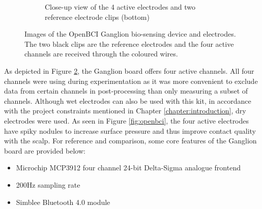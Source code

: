\begin{figure}
\begin{subfigure}[c]{0.45\textwidth}
         \caption{Close-up view of the 4 active electrodes and two reference electrode clips (bottom)}
         \label{fig:openbci-electrodes}
     \end{subfigure}
        \caption[Images of the OpenBCI Ganglion bio-sensing device and electrodes]{Images of the OpenBCI Ganglion bio-sensing device and electrodes. The two black clips are the reference electrodes and the four active channels are received through the coloured wires.}
        \label{fig:openbci-subfigs}
\end{figure}
As depicted in Figure \ref{fig:openbci-subfigs}, the Ganglion board offers four active channels. All four channels were using during experimentation as it was more convenient to exclude data from certain channels in post-processing than only measuring a subset of channels. Although wet electrodes can also be used with this kit, in accordance with the project constraints mentioned in Chapter \ref{chapter:introduction}, dry electrodes were used. As seen in Figure \ref{fig:openbci}, the four active electrodes have spiky nodules to increase surface pressure and thus improve contact quality with the scalp. For reference and comparison, some core features of the Ganglion board are provided below:
\begin{itemize}
    \item Microchip MCP3912 four channel 24-bit Delta-Sigma analogue frontend
    \item 200Hz sampling rate
    \item Simblee Bluetooth 4.0 module
\end{itemize}

